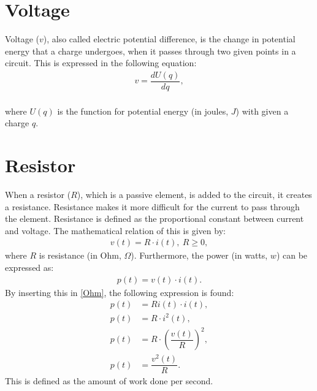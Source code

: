 \section{Voltage}
Voltage ($v$), also called electric potential difference, is the change in potential energy that a charge undergoes, when it passes through two given points in a circuit. This is expressed in the following equation:
\begin{align*}
	v=\dfrac{dU(q)}{dq},
\end{align*}
\\
where $U(q)$ is the function for potential energy (in joules, $J$) with given a charge $q$.



\section{Resistor}
When a resistor ($R$), which is a passive element, is added to the circuit, it creates a resistance. Resistance makes it more difficult for the current to pass through the element. Resistance is defined as the proportional constant between current and voltage. The mathematical relation of this is given by:
\begin{align} 
\label{Ohm}
v(t)=R\cdot i(t),\ R\geq0,
\end{align}
where $R$ is resistance (in Ohm, $\Omega$). Furthermore, the power (in watts, $w$) can be expressed as: \cite[p. 25]{bcircuit} 
\begin{align} 
\label{power}
p(t)=v(t)\cdot i(t).
\end{align}
By inserting this in \eqref{Ohm}, the following expression is found:
\begin{align}
p(t)&=Ri(t)\cdot i(t), \nonumber \\
p(t)&=R \cdot i^2(t), \nonumber \\
p(t)&=R \cdot \left(\dfrac{v(t)}{R} \right)^2, \nonumber \\
p(t)&=\dfrac{v^2(t)}{R}. \label{resistor:power}
\end{align}
This is defined as the amount of work done per second.


